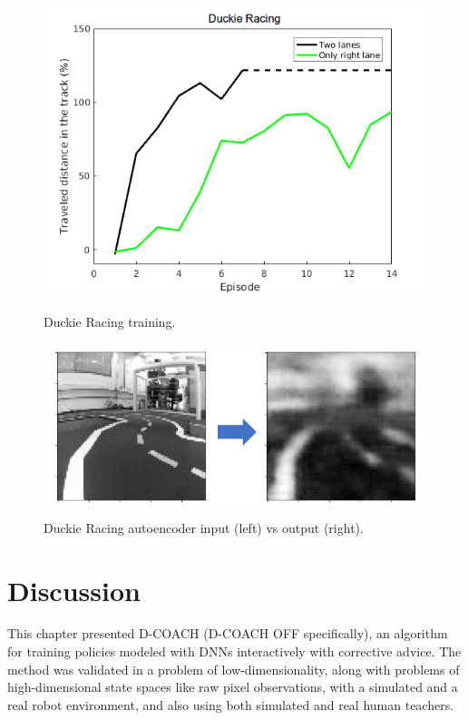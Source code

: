 \begin{figure}[h]
    \centering
    \begin{minipage}{.5\textwidth}
    \vspace{-0.2cm}
    \includegraphics[width=1.0\linewidth]{imagenes/cap3/racing_duckie_results.png}
    \vspace{-0.2cm}
    \caption{Duckie Racing training.}
    \label{fig:racing_duckie_results}
    \end{minipage}%
    \begin{minipage}{.5\textwidth}
    \centering
    \includegraphics[width=1.0\linewidth]{imagenes/cap3/AE_duckie2.png}
    \vspace{-0.2cm}
    \caption{Duckie Racing autoencoder input (left) vs output (right).}
    \label{fig:AE_duckie}
    \end{minipage}
\end{figure}

\section{Discussion}
This chapter presented D-COACH (D-COACH OFF specifically), an algorithm for training policies modeled with DNNs interactively with corrective advice. The method was validated in a problem of low-dimensionality, along with problems of high-dimensional state spaces like raw pixel observations, with a simulated and a real robot environment, and also using both simulated and real human teachers. 

